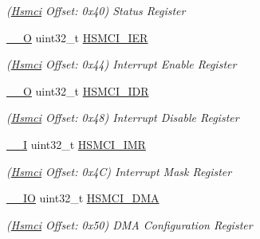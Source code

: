 \begin{DoxyCompactItemize}
\begin{DoxyCompactList}\small\item\em (\mbox{\hyperlink{structHsmci}{Hsmci}} Offset\+: 0x40) Status Register \end{DoxyCompactList}\item 
\mbox{\label{structHsmci_a420f8706d1a668b44bd9abcfdac1af3c}} 
\mbox{\hyperlink{core__cm7_8h_a7e25d9380f9ef903923964322e71f2f6}{\+\_\+\+\_\+O}} uint32\+\_\+t \mbox{\hyperlink{structHsmci_a420f8706d1a668b44bd9abcfdac1af3c}{H\+S\+M\+C\+I\+\_\+\+I\+ER}}
\begin{DoxyCompactList}\small\item\em (\mbox{\hyperlink{structHsmci}{Hsmci}} Offset\+: 0x44) Interrupt Enable Register \end{DoxyCompactList}\item 
\mbox{\label{structHsmci_a171d7bf8b3e27796447729f959e1b632}} 
\mbox{\hyperlink{core__cm7_8h_a7e25d9380f9ef903923964322e71f2f6}{\+\_\+\+\_\+O}} uint32\+\_\+t \mbox{\hyperlink{structHsmci_a171d7bf8b3e27796447729f959e1b632}{H\+S\+M\+C\+I\+\_\+\+I\+DR}}
\begin{DoxyCompactList}\small\item\em (\mbox{\hyperlink{structHsmci}{Hsmci}} Offset\+: 0x48) Interrupt Disable Register \end{DoxyCompactList}\item 
\mbox{\label{structHsmci_a1874b6c20ba009f1db8e43238ceb09d7}} 
\mbox{\hyperlink{core__cm7_8h_af63697ed9952cc71e1225efe205f6cd3}{\+\_\+\+\_\+I}} uint32\+\_\+t \mbox{\hyperlink{structHsmci_a1874b6c20ba009f1db8e43238ceb09d7}{H\+S\+M\+C\+I\+\_\+\+I\+MR}}
\begin{DoxyCompactList}\small\item\em (\mbox{\hyperlink{structHsmci}{Hsmci}} Offset\+: 0x4C) Interrupt Mask Register \end{DoxyCompactList}\item 
\mbox{\label{structHsmci_a20a021186a3b31688811ac35b3da6e84}} 
\mbox{\hyperlink{core__cm7_8h_aec43007d9998a0a0e01faede4133d6be}{\+\_\+\+\_\+\+IO}} uint32\+\_\+t \mbox{\hyperlink{structHsmci_a20a021186a3b31688811ac35b3da6e84}{H\+S\+M\+C\+I\+\_\+\+D\+MA}}
\begin{DoxyCompactList}\small\item\em (\mbox{\hyperlink{structHsmci}{Hsmci}} Offset\+: 0x50) D\+MA Configuration Register \end{DoxyCompactList}\item 

\end{DoxyCompactItemize}
